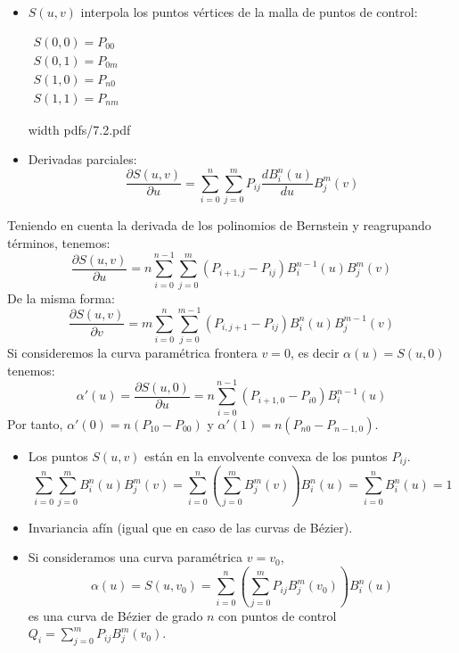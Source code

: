 \documentclass[twoside]{report}
\newcommand{\colocapdf}[2]{\quad\pdfimage width #2 {pdfs/#1.pdf}}
\begin{document}
\begin{itemize}
\item $S(u,v)$ interpola los puntos vértices de la malla de puntos de control:

\begin{center}


\end{center}
\begin{minipage}{.3\textwidth}
$\begin{array}{c} S(0,0)=P_{00}\\ S(0,1)=P_{0m}\\
S(1,0)=P_{n0}\\ S(1,1)=P_{nm}
\end{array}$
\end{minipage} \quad
\begin{minipage}{.3\textwidth}\colocapdf{7.2}{\textwidth}
\end{minipage}

\item Derivadas parciales:
$$\frac{\partial S(u,v)}{\partial u}=\sum_{i=0}^n \sum_{j=0}^m P_{ij} \frac{dB_i^n(u)}{d u} B_j^m(v)$$
\end{itemize}

Teniendo en cuenta la derivada de los polinomios de Bernstein y reagrupando términos, tenemos:
$$\frac{\partial S(u,v)}{\partial u}=n\sum_{i=0}^{n-1} \sum_{j=0}^m (P_{i+1,j}-P_{ij}) B_i^{n-1}(u) B_j^m(v)$$
De la misma forma:
$$\frac{\partial S(u,v)}{\partial v}=m\sum_{i=0}^{n} \sum_{j=0}^{m-1} (P_{i,j+1}-P_{ij}) B_i^{n}(u) B_j^{m-1}(v)$$
Si consideremos la curva paramétrica frontera $v=0$, es decir $\alpha(u)=S(u,0)$ tenemos:
$$\alpha'(u)=\frac{\partial S(u,0)}{\partial u}=n\sum_{i=0}^{n-1} (P_{i+1,0}-P_{i0}) B_i^{n-1}(u)$$
Por tanto, $\alpha'(0)=n(P_{10}-P_{00})$ y $\alpha'(1)=n(P_{n0}-P_{n-1,0}).$

\begin{itemize}
\item Los puntos $S(u,v)$ están en la envolvente convexa de los puntos $P_{ij}$.
$$\sum_{i=0}^{n} \sum_{j=0}^m B_i^{n}(u) B_j^m(v)= \sum_{i=0}^{n}\left( \sum_{j=0}^m B_j^m(v) \right) B_i^{n}(u)=\sum_{i=0}^{n} B_i^{n}(u)=1$$
\item Invariancia afín (igual que en caso de las curvas de Bézier).
\item Si consideramos una curva paramétrica $v=v_0$,
$$\alpha(u)=S(u,v_0)=\sum_{i=0}^n \left( \sum_{j=0}^m P_{ij} B_j^m(v_0) \right) B_i^n(u)$$
es una curva de Bézier de grado $n$ con puntos de control $Q_i=\sum_{j=0}^m P_{ij} B_j^m(v_0).$
\end{itemize}
\end{document}
